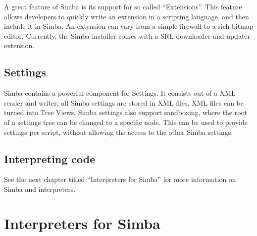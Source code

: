 \documentclass[a4paper, 10pt]{report} %
\begin{document}
A great feature of Simba is its support for so called ``Extensions''.
This feature allows developers to quickly write an extension in a scripting
language, and then include it in Simba. An extension can vary from a simple
firewall to a rich bitmap editor. Currently, the Simba installer comes with a
SRL downloader and updater extension.

\section{Settings}

Simba contains a powerful component for Settings. It consists out of a XML
reader and writer; all Simba settings are stored in XML files. XML files can be
turned into Tree Views. Simba settings also support sandboxing, where the root
of a settings tree can be changed to a specific node. This can be used to
provide settings per script, without allowing the access to the other Simba
settings.

\section{Interpreting code}

See the next chapter titled ``Interpreters for Simba'' for more
information on Simba and interpreters.



\chapter{Interpreters for Simba}
\end{document}
